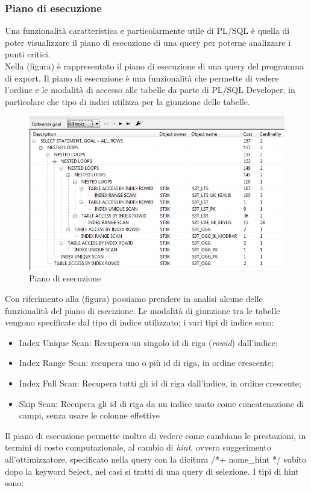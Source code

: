 \subsubsection{Piano di esecuzione}
Una funzionalità caratteristica e particolarmente utile di PL/SQL è quella di poter visualizzare il piano di esecuzione di una query per poterne analizzare i punti critici.\\
Nella (figura) è rappresentato il piano di esecuzione di una query del programma di export. Il piano di esecuzione è una funzionalità che permette di vedere l'ordine e le modalità di accesso alle tabelle da parte di PL/SQL Developer, in particolare che tipo di indici utilizza per la giunzione delle tabelle.
\begin{figure}[!h]
\thispagestyle{empty}
\centering
\includegraphics[scale=0.83]{img/Piano.png}
\caption{Piano di esecuzione}
\end{figure}
Con riferimento alla (figura) possiamo prendere in analisi alcune delle funzionalità del piano di esecizione. Le modalità di giunzione tra le tabelle vengono specificate dal tipo di indice utilizzato; i vari tipi di indice sono:
\begin{itemize}
\item Index Unique Scan: Recupera un singolo id di riga (\textit{rowid}) dall'indice;
\item Index Range Scan: recupera uno o più id di riga, in ordine crescente;
\item Index Full Scan: Recupera tutti gli id di riga dall'indice, in ordine crescente;
\item Skip Scan: Recupera gli id di riga da un indice usato come concatenazione di campi, senza usare le colonne effettive
\end{itemize}
Il piano di esecuzione permette inoltre di vedere come cambiano le prestazioni, in termini di costo computazionale, al cambio di \textit{hint}, ovvero suggerimento all'ottimizzatore, specificato nella query con la dicitura /*+ nome\_hint */ subito dopo la keyword Select, nel casi si tratti di una query di selezione. I tipi di hint sono:
